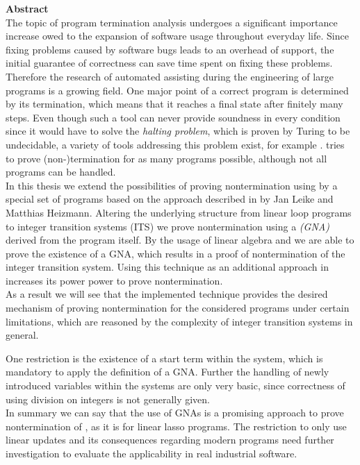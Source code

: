 {\bf\Large Abstract} \\ [1em] 

The topic of program termination analysis undergoes a significant importance increase owed to the expansion of software usage throughout everyday life. Since fixing problems caused by software bugs leads to an overhead of support, the initial guarantee of correctness can save time spent on fixing these problems. Therefore the research of automated assisting during the engineering of large programs is a growing field.
One major point of a correct program is determined by its termination, which means that it reaches a final state after finitely many steps. Even though such a tool can never provide soundness in every condition since it would have to solve the \textit{halting problem}, which is proven by Turing to be undecidable, a variety of tools addressing this problem exist, for example \aprove. \aprove tries to prove (non-)termination for as many programs possible, although not all programs can be handled.\newline \\
In this thesis we extend the possibilities of proving nontermination using \aprove by a special set of programs based on the approach described in \cite{leike2014geometric} by Jan Leike and Matthias Heizmann. Altering the underlying structure from linear loop programs to integer transition systems (ITS) we prove nontermination using a \textit{\gna (GNA)} derived from the program itself. By the usage of linear algebra and \solver we are able to prove the existence of a GNA, which results in a proof of nontermination of the integer transition system. Using this technique as an additional approach in \aprove increases its power power to prove nontermination. 
\\
As a result we will see that the implemented technique provides the desired mechanism of proving nontermination for the considered programs under certain limitations, which are reasoned by the complexity of integer transition systems in general.

 One restriction is the existence of a start term within the system, which is mandatory to apply the definition of a GNA. Further the handling of newly introduced variables within the systems are only very basic, since correctness of using division on integers is not generally given. \newline
\\
In summary we can say that the use of GNAs is a promising approach to prove nontermination of \itss, as it is for linear lasso programs. The restriction to only use linear updates and its consequences regarding modern programs need further investigation to evaluate the applicability in real industrial software.
